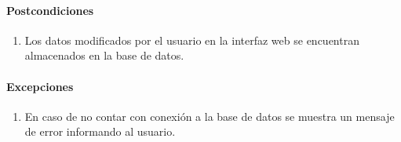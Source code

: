 \paragraph*{Postcondiciones}
\begin{enumerate}
  \item Los datos modificados por el usuario en la interfaz web se encuentran almacenados en la base de datos.
\end{enumerate}
\paragraph*{Excepciones}
\begin{enumerate}
  \item En caso de no contar con conexión a la base de datos se muestra un mensaje de error informando al usuario.
\end{enumerate}

